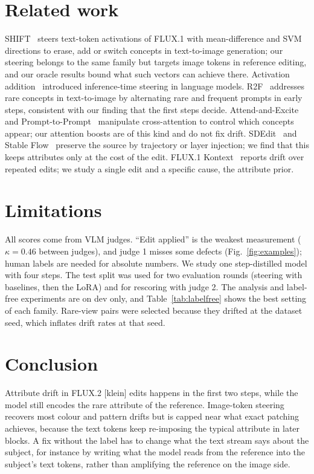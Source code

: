 \documentclass[10pt,twocolumn]{article}
\begin{document}
\section{Related work}
SHIFT~\citep{shift} steers text-token activations of FLUX.1 with mean-difference and SVM directions to erase, add or switch concepts
in text-to-image generation; our steering belongs to the same family but targets image tokens in reference editing, and our
oracle results bound what such vectors can achieve there. Activation addition~\citep{actadd} introduced inference-time steering in
language models. R2F~\citep{r2f} addresses rare concepts in text-to-image by alternating rare and frequent prompts in early steps,
consistent with our finding that the first steps decide. Attend-and-Excite~\citep{attendexcite} and Prompt-to-Prompt~\citep{p2p}
manipulate cross-attention to control which concepts appear; our attention boosts are of this kind and do not fix drift.
SDEdit~\citep{sdedit} and Stable Flow~\citep{stableflow} preserve the source by trajectory or layer injection; we find that this
keeps attributes only at the cost of the edit. FLUX.1 Kontext~\citep{kontext} reports drift over repeated edits; we study a
single edit and a specific cause, the attribute prior.

\section{Limitations}\label{sec:limits}
All scores come from VLM judges. ``Edit applied'' is the weakest measurement ($\kappa=0.46$ between judges), and judge 1 misses
some defects (Fig.~\ref{fig:examples}); human labels are needed for absolute numbers. We study one step-distilled model with four
steps. The test split was used for two evaluation rounds (steering with baselines, then the LoRA) and for rescoring with judge 2.
The analysis and label-free experiments are on dev only, and Table~\ref{tab:labelfree} shows the best setting of each family.
Rare-view pairs were selected because they drifted at the dataset seed, which inflates drift rates at that seed.

\section{Conclusion}
Attribute drift in FLUX.2 [klein] edits happens in the first two steps, while the model still encodes the rare attribute of the
reference. Image-token steering recovers most colour and pattern drifts but is capped near what exact patching achieves,
because the text tokens keep re-imposing the typical attribute in later blocks. A fix without the label has to change what the
text stream says about the subject, for instance by writing what the model reads from the reference into the subject's text
tokens, rather than amplifying the reference on the image side.
\end{document}
